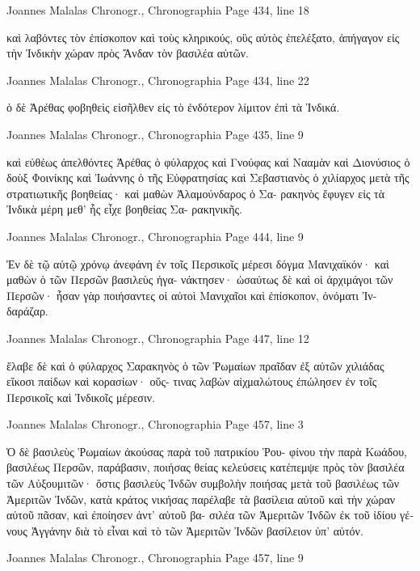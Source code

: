 \documentclass[12pt,letterpaper,twoside,final]{memoir}
\begin{document}
\begin{greek}
Joannes Malalas Chronogr., Chronographia 
Page 434, line 18

                                       καὶ λαβόντες τὸν ἐπίσκοπον 
καὶ τοὺς κληρικούς, οὓς αὐτὸς ἐπελέξατο, ἀπήγαγον εἰς τὴν 
Ἰνδικὴν χώραν πρὸς Ἄνδαν τὸν βασιλέα αὐτῶν. 



Joannes Malalas Chronogr., Chronographia 
Page 434, line 22

    ὁ δὲ Ἀρέθας φοβηθεὶς εἰσῆλθεν εἰς τὸ ἐνδότερον λίμιτον 
ἐπὶ τὰ Ἰνδικά. 



Joannes Malalas Chronogr., Chronographia 
Page 435, line 9

                     καὶ εὐθέως ἀπελθόντες Ἀρέθας ὁ φύλαρχος 
καὶ Γνούφας καὶ Νααμὰν καὶ Διονύσιος ὁ δοὺξ Φοινίκης καὶ 
Ἰωάννης ὁ τῆς Εὐφρατησίας καὶ Σεβαστιανὸς ὁ χιλίαρχος μετὰ 
τῆς στρατιωτικῆς βοηθείας· καὶ μαθὼν Ἀλαμούνδαρος ὁ Σα-
ρακηνὸς ἔφυγεν εἰς τὰ Ἰνδικὰ μέρη μεθ' ἧς εἶχε βοηθείας Σα-
ρακηνικῆς. 



Joannes Malalas Chronogr., Chronographia 
Page 444, line 9

Ἐν δὲ τῷ αὐτῷ χρόνῳ ἀνεφάνη ἐν τοῖς Περσικοῖς μέρεσι 
δόγμα Μανιχαϊκόν· καὶ μαθὼν ὁ τῶν Περσῶν βασιλεὺς ἠγα-
νάκτησεν· ὡσαύτως δὲ καὶ οἱ ἀρχιμάγοι τῶν Περσῶν· ἦσαν 
γὰρ ποιήσαντες οἱ αὐτοὶ Μανιχαῖοι καὶ ἐπίσκοπον, ὀνόματι Ἰν-
δαράζαρ. 



Joannes Malalas Chronogr., Chronographia 
Page 447, line 12

        ἔλαβε δὲ καὶ ὁ φύλαρχος Σαρακηνὸς ὁ τῶν Ῥωμαίων 
πραῖδαν ἐξ αὐτῶν χιλιάδας εἴκοσι παίδων καὶ κορασίων· οὕς-
τινας λαβὼν αἰχμαλώτους ἐπώλησεν ἐν τοῖς Περσικοῖς καὶ 
Ἰνδικοῖς μέρεσιν. 



Joannes Malalas Chronogr., Chronographia 
Page 457, line 3

Ὁ δὲ βασιλεὺς Ῥωμαίων ἀκούσας παρὰ τοῦ πατρικίου Ῥου-  
φίνου τὴν παρὰ Κωάδου, βασιλέως Περσῶν, παράβασιν, ποιήσας 
θείας κελεύσεις κατέπεμψε πρὸς τὸν βασιλέα τῶν Αὐξουμιτῶν· 
ὅστις βασιλεὺς Ἰνδῶν συμβολὴν ποιήσας μετὰ τοῦ βασιλέως τῶν 
Ἀμεριτῶν Ἰνδῶν, κατὰ κράτος νικήσας παρέλαβε τὰ βασίλεια 
αὐτοῦ καὶ τὴν χώραν αὐτοῦ πᾶσαν, καὶ ἐποίησεν ἀντ' αὐτοῦ βα-
σιλέα τῶν Ἀμεριτῶν Ἰνδῶν ἐκ τοῦ ἰδίου γένους Ἀγγάνην διὰ 
τὸ εἶναι καὶ τὸ τῶν Ἀμεριτῶν Ἰνδῶν βασίλειον ὑπ' αὐτόν. 



Joannes Malalas Chronogr., Chronographia 
Page 457, line 9


\end{greek}
\end{document}
